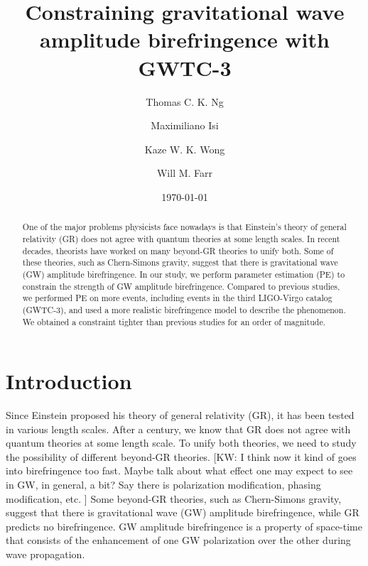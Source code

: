\documentclass[aps,prd,twocolumn,superscriptaddress,preprintnumbers,floatfix,nofootinbib]{revtex4-2}
\newcommand{\kw}[1]{{\color{rb4}[KW: #1 ]}}
\begin{document}
\title{Constraining gravitational wave amplitude birefringence with GWTC-3}

\author{Thomas C. K. Ng}

\author{Maximiliano Isi}

\author{Kaze W. K. Wong}

\author{Will M. Farr}

\date{\today}

\begin{abstract}
    One of the major problems physicists face nowadays is that Einstein's theory of general relativity (GR) does not agree with quantum theories at some length scales.
    In recent decades, theorists have worked on many beyond-GR theories to unify both.
    Some of these theories, such as Chern-Simons gravity, suggest that there is gravitational wave (GW) amplitude birefringence.
    In our study, we perform parameter estimation (PE) to constrain the strength of GW amplitude birefringence.
    Compared to previous studies, we performed PE on more events, including events in the third LIGO-Virgo catalog (GWTC-3), and used a more realistic birefringence model to describe the phenomenon.
    We obtained a constraint tighter than previous studies for an order of magnitude.
\end{abstract}

\maketitle

\section{Introduction}
\label{sec:Introduction}
Since Einstein proposed his theory of general relativity (GR), it has been tested in various length scales.
After a century, we know that GR does not agree with quantum theories at some length scale.
To unify both theories, we need to study the possibility of different beyond-GR theories.
\kw{I think now it kind of goes into birefringence too fast.
Maybe talk about what effect one may expect to see in GW, in general, a bit?
Say there is polarization modification, phasing modification, etc.}
Some beyond-GR theories, such as Chern-Simons gravity, suggest that there is gravitational wave (GW) amplitude birefringence, while GR predicts no birefringence.
GW amplitude birefringence is a property of space-time that consists of the enhancement of one GW polarization over the other during wave propagation.
\end{document}
